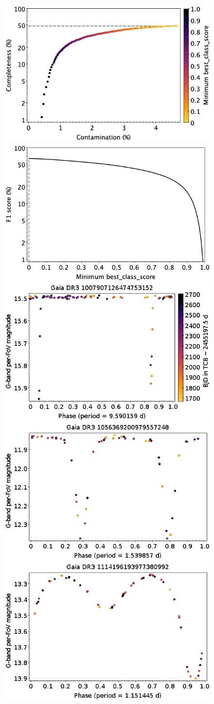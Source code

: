 \documentclass[longauth]{aa}
\begin{document}
\begin{appendix}
\begin{figure}
\centering
{} \includegraphics[width=0.45\hsize]{figures/appendix/ECL_cls_scc.png}  
\hspace{2mm}
 \includegraphics[width=0.45\hsize]{figures/appendix/ECL_cls_sf1.png} \\ 
\vspace{4mm}
 \includegraphics[width=0.45\hsize]{figures/appendix/ECL-10.png}  
\hspace{2mm}
 \includegraphics[width=0.45\hsize]{figures/appendix/ECL-18.png} \\
\vspace{4mm}
 \includegraphics[width=0.45\hsize]{figures/appendix/ECL-32.png}  

\end{figure}
\end{appendix}
\end{document}
